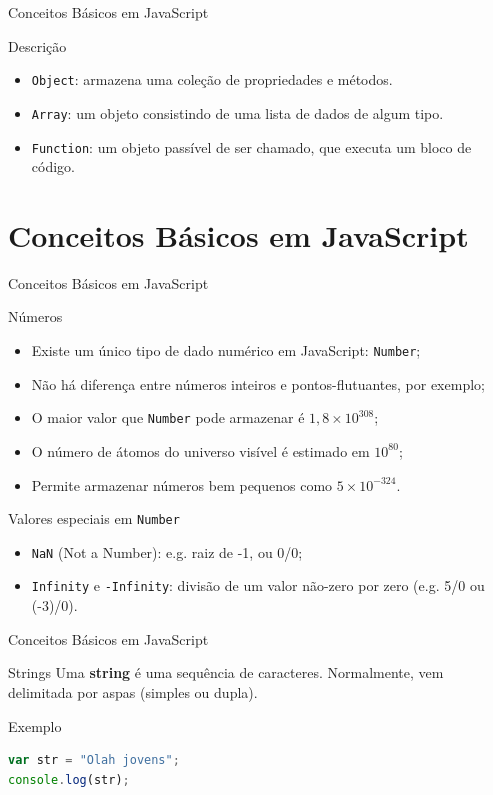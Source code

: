 \documentclass[xcolor=dvipsnames,table]{beamer}
\begin{document}
\begin{frame}[fragile]{Conceitos Básicos em JavaScript}
	\begin{block}{Descrição}
		\begin{itemize}
			\item {\tt Object}: armazena uma coleção de propriedades e métodos.
			\item {\tt Array}: um objeto consistindo de uma lista de dados de algum tipo.
			\item {\tt Function}: um objeto passível de ser chamado, que executa um bloco de código. 
		\end{itemize}	
	\end{block}
\end{frame}

\section{Conceitos Básicos em JavaScript}

\begin{frame}[fragile]{Conceitos Básicos em JavaScript}
	\begin{block}{Números}
		\begin{itemize}
			\item Existe um único tipo de dado numérico em JavaScript: {\tt Number}; \pause
			\item Não há diferença entre números inteiros e pontos-flutuantes, por exemplo; \pause 
			\item O maior valor que {\tt Number} pode armazenar é $1,8 \times 10^{308}$; \pause
			\item O número de átomos do universo visível é estimado em $10^{80}$; \pause
			\item Permite armazenar números bem pequenos como $5 \times 10^{-324}$.
		\end{itemize}	
	\end{block} \pause
	\begin{block}{Valores especiais em {\tt Number}}
		\begin{itemize}
			\item {\tt NaN} (Not a Number): e.g. raiz de -1, ou 0/0; \pause
			\item {\tt Infinity} e {\tt -Infinity}: divisão de um valor não-zero por zero (e.g. 5/0 ou (-3)/0).
		\end{itemize}
	\end{block}
\end{frame}

\begin{frame}[fragile]{Conceitos Básicos em JavaScript}
	\begin{block}{Strings}
		Uma {\bf string} é uma sequência de caracteres. Normalmente, vem delimitada por aspas (simples ou dupla).
	\end{block} \pause
	\begin{block}{Exemplo}
		\begin{lstlisting}[language=JavaScript]
var str = "Olah jovens";
console.log(str);
\end{lstlisting}	
	\end{block}
\end{frame}
\end{document}
